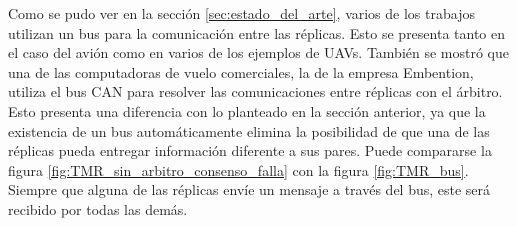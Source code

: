 Como se pudo ver en la sección \ref{sec:estado_del_arte}, varios de los trabajos utilizan un bus para la comunicación entre las réplicas. Esto se presenta tanto en el caso del avión como en varios de los ejemplos de UAVs. También se mostró que una de las computadoras de vuelo comerciales, la de la empresa Embention, utiliza el bus CAN para resolver las comunicaciones entre réplicas con el árbitro. %
Esto presenta una diferencia con lo planteado en la sección anterior, ya que la existencia de un bus automáticamente elimina la posibilidad de que una de las réplicas pueda entregar información diferente a sus pares. Puede compararse la figura \ref{fig:TMR_sin_arbitro_consenso_falla} con la figura \ref{fig:TMR_bus}. Siempre que alguna de las réplicas envíe un mensaje a través del bus, este será recibido por todas las demás.





